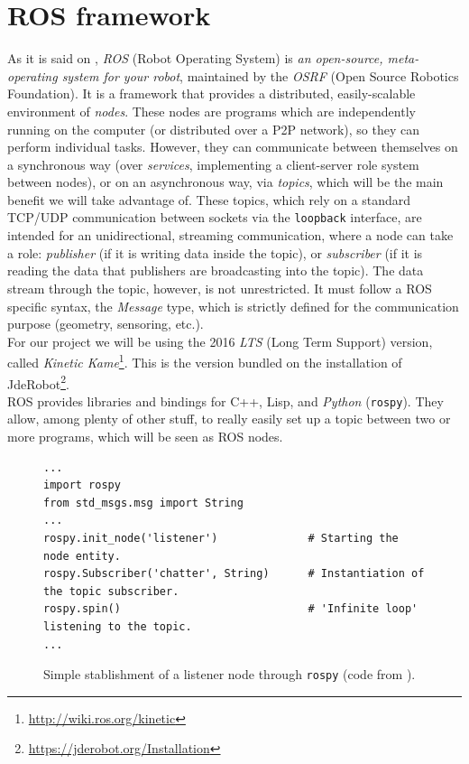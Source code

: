 \section{ROS framework}
	\label{sec:3_ros}
	As it is said on \cite{ros-intro}, \emph{ROS} (Robot Operating System) is \textit{an open-source, meta-operating system for your robot}, maintained by the \emph{OSRF} (Open Source Robotics Foundation). It is a framework that provides a distributed, easily-scalable environment of \emph{nodes}. These nodes are programs which are independently running on the computer (or distributed over a P2P network), so they can perform individual tasks. However, they can communicate between themselves on a synchronous way (over \emph{services}, implementing a client-server role system between nodes), or on an asynchronous way, via \textit{topics}, which will be the main benefit we will take advantage of. These topics, which rely on a standard TCP/UDP communication between sockets via the \texttt{loopback} interface, are intended for an unidirectional, streaming communication, where a node can take a role: \emph{publisher} (if it is writing data inside the topic), or \emph{subscriber} (if it is reading the data that publishers are broadcasting into the topic). The data stream through the topic, however, is not unrestricted. It must follow a ROS specific syntax, the \emph{Message} type, which is strictly defined for the communication purpose (geometry, sensoring, etc.).\\
	
	For our project we will be using the 2016 \textit{LTS} (Long Term Support) version, called \textit{Kinetic Kame}\footnote{\url{http://wiki.ros.org/kinetic}}. This is the version bundled on the installation of JdeRobot\footnote{\url{https://jderobot.org/Installation}}.\\
	
	ROS provides libraries and bindings for C++, Lisp, and \textit{Python} (\texttt{rospy}). They allow, among plenty of other stuff, to really easily set up a topic between two or more programs, which will be seen as ROS nodes.\\
	\begin{figure}[h]
		\begin{lstlisting}
...
import rospy
from std_msgs.msg import String
...
rospy.init_node('listener')              # Starting the node entity.
rospy.Subscriber('chatter', String)      # Instantiation of the topic subscriber.
rospy.spin()                             # 'Infinite loop' listening to the topic.
...
		\end{lstlisting}
		\caption{Simple stablishment of a listener node through \texttt{rospy} (code from \cite{listener-rospy}).}
		\label{fig:3_rospy_listener}
	\end{figure}
	
